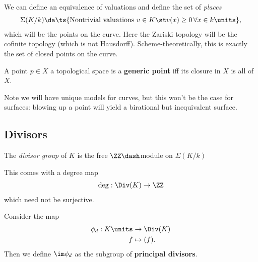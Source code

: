 We can define an equivalence of valuations and define the set of
\emph{places}
\begin{align*}  
\Sigma(K/k) \da \ts{\text{Nontrivial valuations } v\in K \st v(x) \geq 0\, \forall x\in k\units}
,\end{align*} which will be the points on the curve. Here the Zariski
topology will be the cofinite topology (which is not Hausdorff).
Scheme-theoretically, this is exactly the set of closed points on the
curve.

\begin{definition}

A point \(p\in X\) a topological space is a \textbf{generic point} iff
its closure in \(X\) is all of \(X\).

\end{definition}

\begin{remark}

Note we will have unique models for curves, but this won't be the case
for surfaces: blowing up a point will yield a birational but
inequivalent surface.

\end{remark}

\hypertarget{divisors}{%
\subsection{Divisors}\label{divisors}}

\begin{definition}

The \emph{divisor group} of \(K\) is the free \(\ZZ\dash\)module on
\(\Sigma(K/k)\)

\end{definition}

\begin{remark}

This comes with a degree map
\begin{align*}  
\deg: \Div(K) \to \ZZ
\end{align*} which need not be surjective.

\end{remark}

\begin{definition}

Consider the map
\begin{align*}  
\phi_d: K\units &\to \Div(K) \\
f &\mapsto (f)
.\end{align*} Then we define \(\im \phi_d\) as the subgroup of
\textbf{principal divisors}.

\end{definition}

